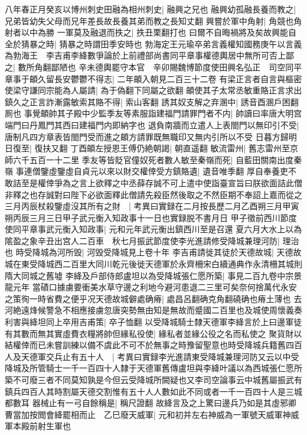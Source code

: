 八年春正月癸亥以博州刺史田融為相州刺史|{
	融興之兄也}
融興幼孤融長養而教之|{
	兄弟皆幼失父母而兄年差長故長養其弟而教之長知丈翻}
興嘗於軍中角射|{
	角競也角射者以中為勝}
一軍莫及融退而抶之|{
	抶丑栗翻打也}
曰爾不自晦禍將及矣故興能自全於猜暴之時|{
	猜暴之時謂田季安時也}
勃海定王元瑜卒弟言義權知國務庚午以言義為勃海王　李吉甫李絳數爭論於上前禮部尚書同平章事權德輿居中無所可否上鄙之|{
	數所角翻鄙陋也}
辛未德輿罷守本官　辛卯賜魏博節度使田興名弘正　司空同平章事于頔久留長安鬱鬱不得志|{
	二年頔入朝見二百三十二卷}
有梁正言者自言與樞密使梁守謙同宗能為人屬請|{
	為于偽翻下同屬之欲翻}
頔使其子太常丞敏重賂正言求出鎮久之正言詐漸露敏索其賂不得|{
	索山客翻}
誘其奴支解之弃溷中|{
	誘音酉溷戶困翻厠也}
事覺頔帥其子殿中少監季友等素服詣建福門請罪門者不内|{
	帥讀曰率唐大明宫端門曰丹鳳門其西曰建福門内即納字也}
退負南牆而立遣人上表閤門以無印引不受|{
	唐制凡四方章表皆閤門受而進之頔方請罪既無職印又無内引所以不受}
日暮方歸明日復至|{
	復扶又翻}
丁酉頔左授恩王傅仍絶朝謁|{
	朝直遥翻}
敏流雷州|{
	舊志雷州至京師六千五百一十二里}
季友等皆貶官僮奴死者數人敏至秦嶺而死|{
	自藍田關南出度秦嶺}
事連僧鑒虛鑒虛自貞元以來以財交權倖受方鎮賂遺|{
	遺音唯季翻}
厚自奉養吏不敢詰至是權倖爭為之言上欲釋之中丞薛存誠不可上遣中使詣臺宣旨曰朕欲面詰此僧非釋之也存誠對曰陛下必欲面釋此僧請先殺臣然後取之不然臣期不奉詔上嘉而從之三月丙辰杖殺鑒虛沒其所有之財　|{
	考異曰實録在二月按長歷二月乙酉朔三月甲寅朔丙辰三月三日甲子武元衡入知政事十一日也實録脱不書月日}
甲子徵前西川節度使同平章事武元衡入知政事|{
	元和元年武元衡出鎮西川至是召還}
夏六月大水上以為隂盈之象辛丑出宫人二百車　秋七月振武節度使李光進請修受降城兼理河防|{
	理治也}
時受降城為河所毁|{
	河毁受降城見上卷十年}
李吉甫請徙其徒於天德故城|{
	天德故城在東受降城西二百里大同川乾元後徙天德軍於永齊柵宋白續通典作永清柵其城則隋大同城之舊墟}
李絳及戶部侍郎盧坦以為受降城張仁愿所築|{
	事見二百九卷中宗景龍元年}
當磧口據虜要衝美水草守邊之利地今避河患退二三里可矣奈何捨萬代永安之策徇一時省費之便乎况天德故城僻處确瘠|{
	處昌呂翻确克角翻磽确也瘠土薄也}
去河絶遠烽候警急不相應接虜忽唐突勢無由知是無故而蹙國二百里也及城使周懷義奏利害與絳坦同上卒用吉甫策|{
	卒子恤翻}
以受降城騎士隸天德軍李絳言於上曰邊軍徒有其數而無其實虛費衣糧將帥但緣私役使|{
	緣私者並緣公役之名而私使之}
聚貨財以結權倖而已未嘗訓練以備不虞此不可不於無事之時豫留聖意也時受降城兵籍舊四百人及天德軍交兵止有五十人　|{
	考異曰實録李光進請東受降城兼理河防又云以中受降城及所管騎士一千一百四十人隸于天德軍舊傳盧坦與李絳叶議以為西城張仁愿所築不可廢三者不同莫知孰是今但云受降城所闕疑也又李司空論事云中城舊屬振武有鎮兵四百人其時割屬天德交割惟有五十人人數如此不同或者一千一百四十人是三城都數耳}
器械止有一弓自餘稱是|{
	稱尺證翻}
故絳言及之上驚曰邊兵乃如是其虛邪卿曹當加按閲會絳罷相而止　乙巳廢天威軍|{
	元和初并左右神威為一軍號天威軍神威軍本殿前射生軍也}
